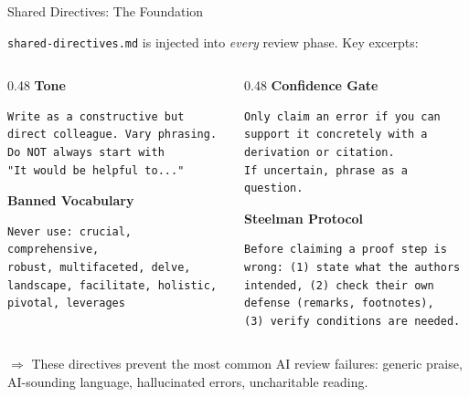 \documentclass[10pt,english,aspectratio=169]{beamer}
\begin{document}
\begin{frame}[fragile]{Shared Directives: The Foundation}

\texttt{shared-directives.md} is injected into \emph{every} review phase. Key excerpts:

\vspace{0.2cm}
\begin{columns}[T]
\begin{column}{0.48\textwidth}
\textbf{Tone}
\begin{lstlisting}[style=markdownstyle, basicstyle=\ttfamily\scriptsize]
Write as a constructive but
direct colleague. Vary phrasing.
Do NOT always start with
"It would be helpful to..."
\end{lstlisting}

\vspace{0.1cm}
\textbf{Banned Vocabulary}
\begin{lstlisting}[style=markdownstyle, basicstyle=\ttfamily\scriptsize]
Never use: crucial, comprehensive,
robust, multifaceted, delve,
landscape, facilitate, holistic,
pivotal, leverages
\end{lstlisting}
\end{column}

\begin{column}{0.48\textwidth}
\textbf{Confidence Gate}
\begin{lstlisting}[style=markdownstyle, basicstyle=\ttfamily\scriptsize]
Only claim an error if you can
support it concretely with a
derivation or citation.
If uncertain, phrase as a question.
\end{lstlisting}

\vspace{0.1cm}
\textbf{Steelman Protocol}
\begin{lstlisting}[style=markdownstyle, basicstyle=\ttfamily\scriptsize]
Before claiming a proof step is
wrong: (1) state what the authors
intended, (2) check their own
defense (remarks, footnotes),
(3) verify conditions are needed.
\end{lstlisting}
\end{column}
\end{columns}

\vspace{0.2cm}
$\Rightarrow$ These directives prevent the most common AI review failures: generic praise, AI-sounding language, hallucinated errors, uncharitable reading.

\end{frame}
\end{document}
